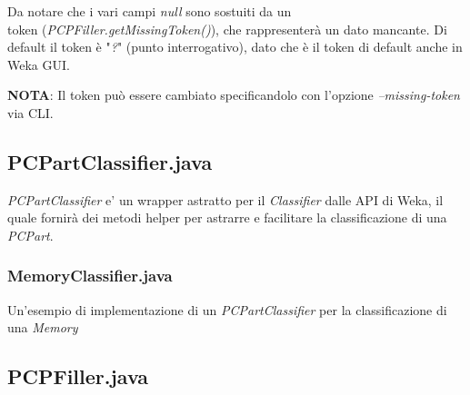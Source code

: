 \documentclass[12pt]{report}
\begin{document}
Da notare che i vari campi \textit{null} sono sostuiti da un \\token (\textit{PCPFiller.getMissingToken()}),
che rappresenterà un dato mancante. Di default il token è "\textit{?}" (punto interrogativo), dato che
è il token di default anche in Weka GUI.

\textbf{NOTA}: Il token può essere cambiato specificandolo con l'opzione \textit{--missing-token} via CLI.

\newpage
\subsection{PCPartClassifier.java}
\textit{PCPartClassifier} e' un wrapper astratto per il \textit{Classifier} dalle API di Weka, il quale
fornirà dei metodi helper per astrarre e facilitare la classificazione di una \textit{PCPart}.



\subsubsection{MemoryClassifier.java}

Un'esempio di implementazione di un \textit{PCPartClassifier} per la classificazione di una \textit{Memory}


\newpage
\subsection{PCPFiller.java}
\end{document}
